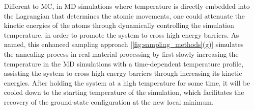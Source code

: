 Different to MC, in MD simulations where temperature is directly embedded into the Lagrangian that determines the atomic movements, one could attenuate the kinetic energies of the atoms  through dynamically controlling the simulation temperature, in order to promote the system to cross high energy barriers. As named, this enhanced sampling approach [\cref{fig:sampling_methods}(g)] simulates the annealing process in real material processing by first slowly increasing the temperature in the MD simulations with a time-dependent temperature profile, assisting the system to cross high energy barriers through increasing its kinetic energies.  After holding the system at a high temperature for some time, it will be cooled down  to the starting temperature of the simulation, which facilitates the recovery of the ground-state configuration at the new local minimum.